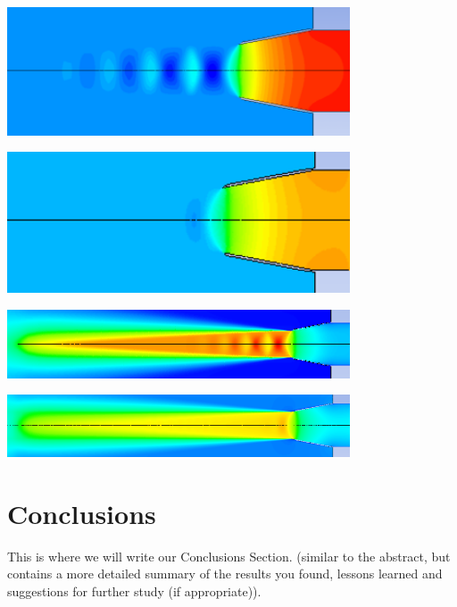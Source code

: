 \documentclass[12pt]{article} %
\begin{document}
\begin{center}
    \includegraphics[width=4in]{Pressure_Air.png}
    \label{fig:pressure_air}
\end{center}

\begin{center}
    \includegraphics[width=4in]{Pressure_CO2.png}
    \label{fig:pressure_CO2}
\end{center}

\begin{center}
    \includegraphics[width=4in]{Mach_Air.png}
    \label{fig:mach_air}
\end{center}

\begin{center}
    \includegraphics[width=4in]{Mach_CO2.png}
    \label{fig:mach_CO2}
\end{center}

\section{Conclusions}
This is where we will write our Conclusions Section.  (similar to the abstract, but contains a more detailed summary
of the results you found, lessons learned and suggestions for further study (if
appropriate)).
\end{document}
